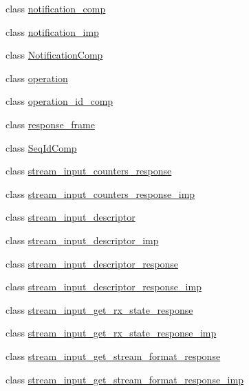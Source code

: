 \begin{DoxyCompactItemize}
\item 
class \hyperlink{classavdecc__lib_1_1notification__comp}{notification\+\_\+comp}
\item 
class \hyperlink{classavdecc__lib_1_1notification__imp}{notification\+\_\+imp}
\item 
class \hyperlink{classavdecc__lib_1_1_notification_comp}{Notification\+Comp}
\item 
class \hyperlink{classavdecc__lib_1_1operation}{operation}
\item 
class \hyperlink{classavdecc__lib_1_1operation__id__comp}{operation\+\_\+id\+\_\+comp}
\item 
class \hyperlink{classavdecc__lib_1_1response__frame}{response\+\_\+frame}
\item 
class \hyperlink{classavdecc__lib_1_1_seq_id_comp}{Seq\+Id\+Comp}
\item 
class \hyperlink{classavdecc__lib_1_1stream__input__counters__response}{stream\+\_\+input\+\_\+counters\+\_\+response}
\item 
class \hyperlink{classavdecc__lib_1_1stream__input__counters__response__imp}{stream\+\_\+input\+\_\+counters\+\_\+response\+\_\+imp}
\item 
class \hyperlink{classavdecc__lib_1_1stream__input__descriptor}{stream\+\_\+input\+\_\+descriptor}
\item 
class \hyperlink{classavdecc__lib_1_1stream__input__descriptor__imp}{stream\+\_\+input\+\_\+descriptor\+\_\+imp}
\item 
class \hyperlink{classavdecc__lib_1_1stream__input__descriptor__response}{stream\+\_\+input\+\_\+descriptor\+\_\+response}
\item 
class \hyperlink{classavdecc__lib_1_1stream__input__descriptor__response__imp}{stream\+\_\+input\+\_\+descriptor\+\_\+response\+\_\+imp}
\item 
class \hyperlink{classavdecc__lib_1_1stream__input__get__rx__state__response}{stream\+\_\+input\+\_\+get\+\_\+rx\+\_\+state\+\_\+response}
\item 
class \hyperlink{classavdecc__lib_1_1stream__input__get__rx__state__response__imp}{stream\+\_\+input\+\_\+get\+\_\+rx\+\_\+state\+\_\+response\+\_\+imp}
\item 
class \hyperlink{classavdecc__lib_1_1stream__input__get__stream__format__response}{stream\+\_\+input\+\_\+get\+\_\+stream\+\_\+format\+\_\+response}
\item 
class \hyperlink{classavdecc__lib_1_1stream__input__get__stream__format__response__imp}{stream\+\_\+input\+\_\+get\+\_\+stream\+\_\+format\+\_\+response\+\_\+imp}

\end{DoxyCompactItemize}
